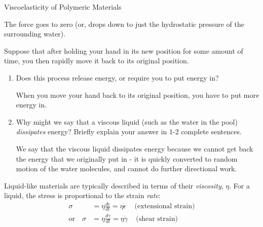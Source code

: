 \begin{activity}{Viscoelasticity of Polymeric Materials}
\begin{ctqs}
\begin{enumerate}
				\begin{solution}[1in]
					The force goes to zero (or, drops down to just the hydrostatic pressure of the surrounding water).
				\end{solution}
			
		\end{enumerate}
		
	\question Suppose that after holding your hand in its new position for some amount of time, you then rapidly move it back to its original position.
	
		\begin{enumerate}
			
			\item Does this process release energy, or require you to put energy in?
			
				\begin{solution}[1in]
					When you move your hand back to its original position, you have to put more energy in.
				\end{solution}
			
			\item Why might we say that a viscous liquid (such as the water in the pool) \emph{dissipates} energy? Briefly explain your answer in 1-2 complete sentences.
			
				\begin{solution}[2in]
					We say that the viscous liquid dissipates energy because we cannot get back the energy that we originally put in - it is quickly converted to random motion of the water molecules, and cannot do further directional work.
				\end{solution}
			
		\end{enumerate}
	
\end{ctqs}

\begin{infobox}
	
	Liquid-like materials are typically described in terms of their \emph{viscosity}, $\eta$.  For a liquid, the stress is proportional to the strain \emph{rate}:
	\begin{align*}
		\sigma &= \eta\frac{d\epsilon}{dt}=\eta\dot\epsilon\,\,\,\,\,\,\,\text{(extensional strain)}\\
		\text{or}\,\,\,\,\,\,\sigma &= \eta\frac{d\gamma}{dt}=\eta\dot\gamma\,\,\,\,\,\,\,\text{(shear strain)}
	\end{align*}


\end{infobox}
\end{activity}
